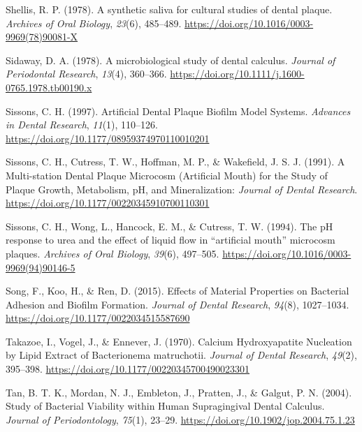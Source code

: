 \documentclass[
  b5paper,
]{book}
\newlength{\cslhangindent}
\newlength{\cslentryspacingunit} %
\newenvironment{CSLReferences}[2] %
 {%
  \setlength{\parindent}{0pt}
  \ifodd #1
  \let\oldpar\par
  \def\par{\hangindent=\cslhangindent\oldpar}
  \fi
  \setlength{\parskip}{#2\cslentryspacingunit}
 }%
 {}
\begin{document}
\begin{CSLReferences}{1}{0}
\leavevmode{}%
Shellis, R. P. (1978). A synthetic saliva for cultural studies of dental
plaque. \emph{Archives of Oral Biology}, \emph{23}(6), 485--489.
\url{https://doi.org/10.1016/0003-9969(78)90081-X}

\leavevmode{}%
Sidaway, D. A. (1978). A microbiological study of dental calculus.
\emph{Journal of Periodontal Research}, \emph{13}(4), 360--366.
\url{https://doi.org/10.1111/j.1600-0765.1978.tb00190.x}

\leavevmode{}%
Sissons, C. H. (1997). Artificial {Dental Plaque Biofilm Model Systems}.
\emph{Advances in Dental Research}, \emph{11}(1), 110--126.
\url{https://doi.org/10.1177/08959374970110010201}

\leavevmode{}%
Sissons, C. H., Cutress, T. W., Hoffman, M. P., \& Wakefield, J. S. J.
(1991). A {Multi-station Dental Plaque Microcosm} ({Artificial Mouth})
for the {Study} of {Plaque Growth}, {Metabolism}, {pH}, and
{Mineralization}: \emph{Journal of Dental Research}.
\url{https://doi.org/10.1177/00220345910700110301}

\leavevmode{}%
Sissons, C. H., Wong, L., Hancock, E. M., \& Cutress, T. W. (1994). The
{pH} response to urea and the effect of liquid flow in {``artificial
mouth''} microcosm plaques. \emph{Archives of Oral Biology},
\emph{39}(6), 497--505.
\url{https://doi.org/10.1016/0003-9969(94)90146-5}

\leavevmode{}%
Song, F., Koo, H., \& Ren, D. (2015). Effects of {Material Properties}
on {Bacterial Adhesion} and {Biofilm Formation}. \emph{Journal of Dental
Research}, \emph{94}(8), 1027--1034.
\url{https://doi.org/10.1177/0022034515587690}

\leavevmode{}%
Takazoe, I., Vogel, J., \& Ennever, J. (1970). Calcium {Hydroxyapatite
Nucleation} by {Lipid Extract} of {Bacterionema} matruchotii.
\emph{Journal of Dental Research}, \emph{49}(2), 395--398.
\url{https://doi.org/10.1177/00220345700490023301}

\leavevmode{}%
Tan, B. T. K., Mordan, N. J., Embleton, J., Pratten, J., \& Galgut, P.
N. (2004). Study of {Bacterial Viability} within {Human Supragingival
Dental Calculus}. \emph{Journal of Periodontology}, \emph{75}(1),
23--29. \url{https://doi.org/10.1902/jop.2004.75.1.23}


\end{CSLReferences}
\end{document}
